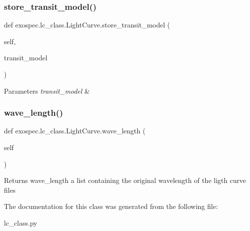 \subsubsection{\texorpdfstring{store\+\_\+transit\+\_\+model()}{store\_transit\_model()}}
{\footnotesize\ttfamily def exospec.\+lc\+\_\+class.\+Light\+Curve.\+store\+\_\+transit\+\_\+model (\begin{DoxyParamCaption}\item[{}]{self,  }\item[{}]{transit\+\_\+model }\end{DoxyParamCaption})}


\begin{DoxyParams}{Parameters}
{\em transit\+\_\+model} & \\
\hline
\end{DoxyParams}
\mbox{\label{classexospec_1_1lc__class_1_1_light_curve_a9da0e4bf8f9ea153afb534d63fb7d24a}} 
\subsubsection{\texorpdfstring{wave\+\_\+length()}{wave\_length()}}
{\footnotesize\ttfamily def exospec.\+lc\+\_\+class.\+Light\+Curve.\+wave\+\_\+length (\begin{DoxyParamCaption}\item[{}]{self }\end{DoxyParamCaption})}

\begin{DoxyReturn}{Returns}
wave\+\_\+length a list containing the original wavelength of the ligth curve files 
\end{DoxyReturn}


The documentation for this class was generated from the following file\+:\begin{DoxyCompactItemize}
\item 
lc\+\_\+class.\+py\end{DoxyCompactItemize}
